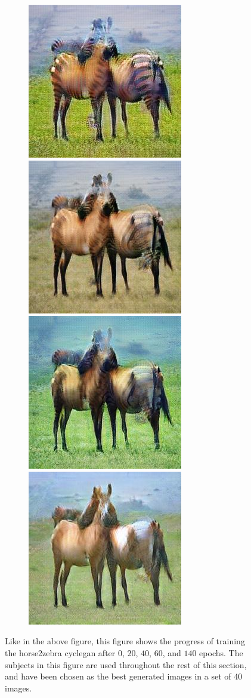 \documentclass[11pt, fleqn, titlepage]{article}
\newcommand\skipperer{0.45pt}
\newcommand{\1}[1]{\mathds{1}\left[#1\right]}
\begin{document}
\begin{figure}[H]
\begin{subfigure}[b]{0.8\textwidth}
		\hskip\skipperer
		\includegraphics[width=0.15\linewidth]{imgs/horse2zebra_cycle/gaussnoise/progress/51_20_fake_a}
		\hskip\skipperer
		\includegraphics[width=0.15\linewidth]{imgs/horse2zebra_cycle/gaussnoise/progress/51_40_fake_a}
		\hskip\skipperer
		\includegraphics[width=0.15\linewidth]{imgs/horse2zebra_cycle/gaussnoise/progress/51_60_fake_a}
		\hskip\skipperer
		\includegraphics[width=0.15\linewidth]{imgs/horse2zebra_cycle/gaussnoise/progress/51_140_fake_a}
	\end{subfigure}
	\caption{Like in the above figure, this figure shows the progress of training the horse2zebra cyclegan after $0$, $20$, $40$, $60$, and $140$ epochs. The subjects in this figure are used throughout the rest of this section, and have been chosen as the best generated images in a set of 40 images.}
	\label{fig:horse2zebra_progress_zebra}
\end{figure}
\end{document}

